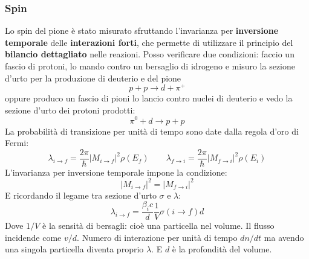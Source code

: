 \subsubsection{Spin}
Lo spin del pione è stato misurato sfruttando l'invarianza per \textbf{inversione temporale} delle \textbf{interazioni forti}, che permette di utilizzare il principio del \textbf{bilancio dettagliato} nelle reazioni. Posso verificare due condizioni: faccio un fascio di protoni, lo mando contro un bersaglio di idrogeno e misuro la sezione d'urto per la produzione di deuterio e del pione
\begin{equation*}
    p+p\to d+\pi^+
\end{equation*}
oppure produco un fascio di pioni lo lancio contro nuclei di deuterio e vedo la sezione d'urto dei protoni prodotti:
\begin{equation*}
    \pi^0+d\to p+p
\end{equation*}
La probabilità di transizione per unità di tempo sono date dalla regola d'oro di Fermi:
\begin{equation*}
    \lambda_{i\to f}=\frac{2\pi}{\hbar}|M_{i\to f}|^2\rho(E_f) \qquad \lambda_{f\to i}=\frac{2\pi}{\hbar}|M_{f\to i}|^2\rho(E_i)
\end{equation*}
L'invarianza per inversione temporale impone la condizione:
\begin{equation*}
    |M_{i\to f}|^2=|M_{f\to i}|^2
\end{equation*}
E ricordando il legame tra sezione d'urto $\sigma$ e $\lambda$:
\begin{equation*}
    \lambda_{i\to f}=\frac{\beta_ic}{d}\frac{1}{V}\sigma(i\to f)d
\end{equation*}
Dove $1/V$ è la sensità di bersagli: cioè una particella nel volume. Il flusso incidende come $v/d$. Numero di interazione per unità di tempo $dn/dt$ ma avendo una singola particella diventa proprio $\lambda$. E $d$ è la profondità del volume. 

